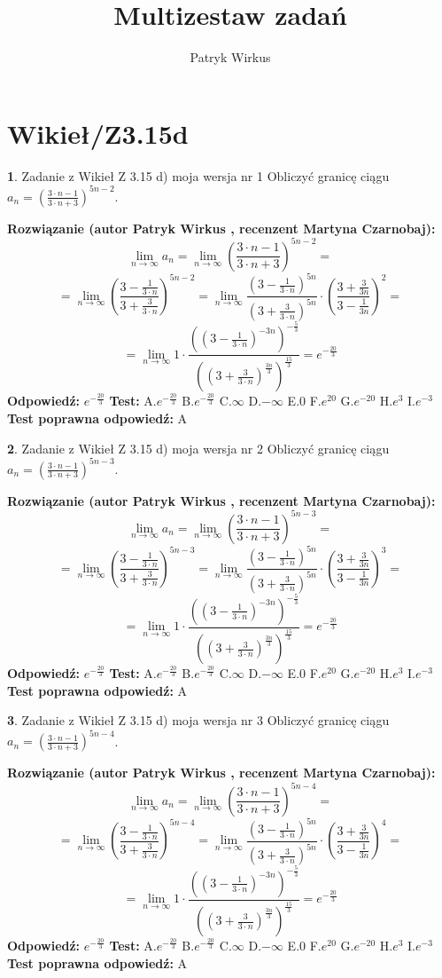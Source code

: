 \documentclass[12pt, a4paper]{article}
\title{Multizestaw zadań}
\author{Patryk Wirkus}
\date{}
\theoremstyle{definition} %
\newtheorem{zad}{}
\newcommand{\kategoria}[1]{\section{#1}}
\newcommand{\zadStart}[1]{\begin{zad}#1\newline}
\newcommand{\zadStop}{\end{zad}}
\newcommand{\rozwStart}[2]{\noindent \textbf{Rozwiązanie (autor #1 , recenzent #2): }\newline}
\newcommand{\rozwStop}{\newline}
\newcommand{\odpStart}{\noindent \textbf{Odpowiedź:}\newline}
\newcommand{\odpStop}{\newline}
\newcommand{\testStart}{\noindent \textbf{Test:}\newline}
\newcommand{\testStop}{\newline}
\newcommand{\kluczStart}{\noindent \textbf{Test poprawna odpowiedź:}\newline}
\newcommand{\kluczStop}{\newline}
\begin{document}
\maketitle

\kategoria{Wikieł/Z3.15d}


\zadStart{Zadanie z Wikieł Z 3.15 d) moja wersja nr 1}
Obliczyć granicę ciągu $a_{n}=(\frac{3\cdot n - 1}{3 \cdot n + 3})^{5n-2}$.
\zadStop
\rozwStart{Patryk Wirkus}{Martyna Czarnobaj}
$$\lim\limits_{n\to\infty} a_{n} = \lim\limits_{n\to\infty}(\frac{3\cdot n - 1}{3 \cdot n + 3})^{5n-2}=$$
$$=\lim\limits_{n\to\infty}(\frac{3 - \frac{1}{3\cdot n}}{3 + \frac{3}{3 \cdot n}})^{5n-2}=\lim\limits_{n\to\infty}\frac{(3 - \frac{1}{3\cdot n})^{5n}}{(3 + \frac{3}{3\cdot n})^{5n}} \cdot (\frac{3+\frac{3}{3n}}{3-\frac{1}{3n}})^{2}=$$
$$=\lim\limits_{n\to\infty} 1 \cdot \frac{((3-\frac{1}{3 \cdot n})^{-3n})^{-\frac{5}{3}}}{((3+\frac{3}{3 \cdot n})^{\frac{3n}{3}})^{\frac{15}{3}}} =e^{-\frac{20}{3}}$$
\rozwStop
\odpStart
$e^{-\frac{20}{3}}$
\odpStop
\testStart
A.$ e^{-\frac{20}{3}}$
B.$ e^{-\frac{20}{3}}$
C.$\infty$
D.$-\infty$
E.$0$
F.$e^{20}$
G.$e^{-20}$
H.$e^{3}$
I.$e^{-3}$
\testStop
\kluczStart
A
\kluczStop



\zadStart{Zadanie z Wikieł Z 3.15 d) moja wersja nr 2}
Obliczyć granicę ciągu $a_{n}=(\frac{3\cdot n - 1}{3 \cdot n + 3})^{5n-3}$.
\zadStop
\rozwStart{Patryk Wirkus}{Martyna Czarnobaj}
$$\lim\limits_{n\to\infty} a_{n} = \lim\limits_{n\to\infty}(\frac{3\cdot n - 1}{3 \cdot n + 3})^{5n-3}=$$
$$=\lim\limits_{n\to\infty}(\frac{3 - \frac{1}{3\cdot n}}{3 + \frac{3}{3 \cdot n}})^{5n-3}=\lim\limits_{n\to\infty}\frac{(3 - \frac{1}{3\cdot n})^{5n}}{(3 + \frac{3}{3\cdot n})^{5n}} \cdot (\frac{3+\frac{3}{3n}}{3-\frac{1}{3n}})^{3}=$$
$$=\lim\limits_{n\to\infty} 1 \cdot \frac{((3-\frac{1}{3 \cdot n})^{-3n})^{-\frac{5}{3}}}{((3+\frac{3}{3 \cdot n})^{\frac{3n}{3}})^{\frac{15}{3}}} =e^{-\frac{20}{3}}$$
\rozwStop
\odpStart
$e^{-\frac{20}{3}}$
\odpStop
\testStart
A.$ e^{-\frac{20}{3}}$
B.$ e^{-\frac{20}{3}}$
C.$\infty$
D.$-\infty$
E.$0$
F.$e^{20}$
G.$e^{-20}$
H.$e^{3}$
I.$e^{-3}$
\testStop
\kluczStart
A
\kluczStop



\zadStart{Zadanie z Wikieł Z 3.15 d) moja wersja nr 3}
Obliczyć granicę ciągu $a_{n}=(\frac{3\cdot n - 1}{3 \cdot n + 3})^{5n-4}$.
\zadStop
\rozwStart{Patryk Wirkus}{Martyna Czarnobaj}
$$\lim\limits_{n\to\infty} a_{n} = \lim\limits_{n\to\infty}(\frac{3\cdot n - 1}{3 \cdot n + 3})^{5n-4}=$$
$$=\lim\limits_{n\to\infty}(\frac{3 - \frac{1}{3\cdot n}}{3 + \frac{3}{3 \cdot n}})^{5n-4}=\lim\limits_{n\to\infty}\frac{(3 - \frac{1}{3\cdot n})^{5n}}{(3 + \frac{3}{3\cdot n})^{5n}} \cdot (\frac{3+\frac{3}{3n}}{3-\frac{1}{3n}})^{4}=$$
$$=\lim\limits_{n\to\infty} 1 \cdot \frac{((3-\frac{1}{3 \cdot n})^{-3n})^{-\frac{5}{3}}}{((3+\frac{3}{3 \cdot n})^{\frac{3n}{3}})^{\frac{15}{3}}} =e^{-\frac{20}{3}}$$
\rozwStop
\odpStart
$e^{-\frac{20}{3}}$
\odpStop
\testStart
A.$ e^{-\frac{20}{3}}$
B.$ e^{-\frac{20}{3}}$
C.$\infty$
D.$-\infty$
E.$0$
F.$e^{20}$
G.$e^{-20}$
H.$e^{3}$
I.$e^{-3}$
\testStop
\kluczStart
A
\kluczStop
\end{document}
